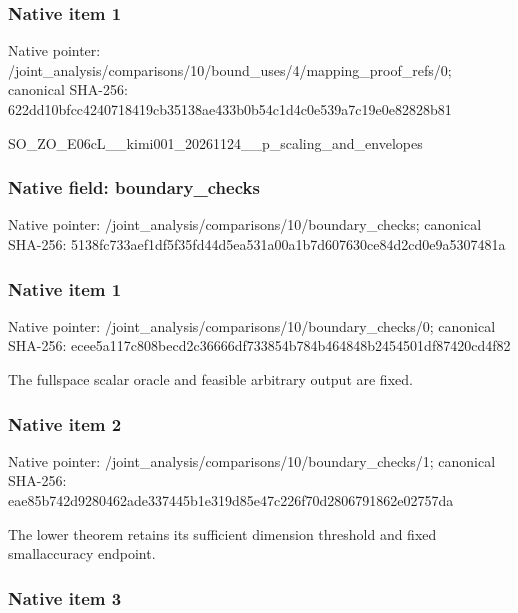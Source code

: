 \documentclass[10pt,a4paper]{article}
\begin{document}
\subsubsection{Native item 1}


Native pointer: /joint\_analysis/comparis\allowbreak{}ons/10/bound\_uses/4/mapp\allowbreak{}ing\_proof\_refs/0; canonical SHA-256: 622dd10bfcc4240718419cb3\allowbreak{}5138ae433b0b54c1d4c0e539\allowbreak{}a7c19e0e82828b81


SO\_ZO\_E06cL\_\_kimi001\_202\allowbreak{}61124\_\_p\_scaling\_and\_env\allowbreak{}elopes


\subsubsection{Native field: boundary\_checks}


Native pointer: /joint\_analysis/comparis\allowbreak{}ons/10/boundary\_checks; canonical SHA-256: 5138fc733aef1df5f35fd44d\allowbreak{}5ea531a00a1b7d607630ce84\allowbreak{}d2cd0e9a5307481a



\subsubsection{Native item 1}


Native pointer: /joint\_analysis/comparis\allowbreak{}ons/10/boundary\_checks/0; canonical SHA-256: ecee5a117c808becd2c36666\allowbreak{}df733854b784b464848b2454\allowbreak{}501df87420cd4f82


The fullspace scalar oracle and feasible arbitrary output are fixed.


\subsubsection{Native item 2}


Native pointer: /joint\_analysis/comparis\allowbreak{}ons/10/boundary\_checks/1; canonical SHA-256: eae85b742d9280462ade3374\allowbreak{}45b1e319d85e47c226f70d28\allowbreak{}06791862e02757da


The lower theorem retains its sufficient dimension threshold and fixed smallaccuracy endpoint.


\subsubsection{Native item 3}
\end{document}
